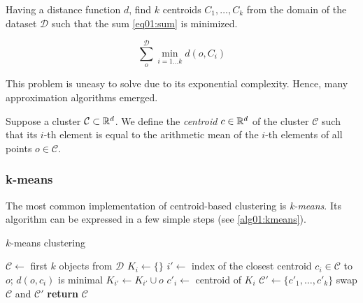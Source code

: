 \begin{problem}
	Having a distance function $d$, find $k$ centroids $C_1,\dots,C_k$ from the domain of the dataset $\mathcal{D}$ such that the sum \ref{eq01:sum}
	is minimized.
\end{problem}

\begin{equation}\label{eq01:sum}
	\sum_o^{\mathcal{D}} \min_{i=1\dots k}d(o,C_i)
\end{equation}

This problem is uneasy to solve due to its exponential complexity. Hence, many approximation algorithms emerged. 

\begin{defn}[Centroid]
	Suppose a cluster $\mathcal{C} \subset \mathbb{R}^d$. We define the \emph{centroid} $c \in \mathbb{R}^d$ of the cluster $\mathcal{C}$ such that its $i$-th element is equal to the arithmetic mean of the $i$-th elements of all points $o \in \mathcal{C}$. 
	\label{def01:centr}
\end{defn}

\subsubsection{k-means}

The most common implementation of centroid-based clustering is \emph{k-means}. Its algorithm can be expressed in a few simple steps (see \ref{alg01:kmeans}).

\begin{algorithm}
	\caption{$k$-means clustering}
	\label{alg01:kmeans}
	\begin{algorithmic}[1]
		\State $\mathcal{C} \gets$ first $k$ objects from  $\mathcal{D}$ 
		\Repeat
				\State $K_i \gets \{\}$
			\EndFor
				\State $i' \gets$ index of the closest centroid $c_i \in \mathcal{C}$ to $o$; $d(o,c_i)$ is minimal
				\State $K_{i'} \gets K_{i'} \cup o$ 
			\EndFor
				\State $c'_i \gets$ centroid of $K_i$ 
			\EndFor
			\State $\mathcal{C}' \gets \{c'_1,\dots,c'_k\}$
			\State swap $\mathcal{C}$ and $\mathcal{C}'$
		\State \textbf{return} $\mathcal{C}$
		\EndProcedure
	\end{algorithmic}
\end{algorithm}


